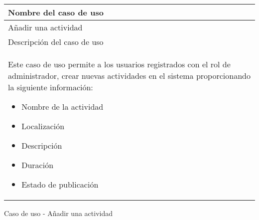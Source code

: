 \begin{identificacionCasoDeUso}
	\begin{tabular} { | p{16.5cm} | }
		\hline
		Nombre del caso de uso      \\ \hline
		Añadir una actividad        \\ \hline
		Descripción del caso de uso \\ \hline
		Este caso de uso permite a los usuarios registrados con el rol de administrador, crear nuevas actividades en el sistema proporcionando la siguiente información:
		\begin{itemize}
			\item Nombre de la actividad
			\item Localización
			\item Descripción
			\item Duración
			\item Estado de publicación
		\end{itemize} \\ \hline
	\end{tabular}
	\caption{Caso de uso - Añadir una actividad}
\end{identificacionCasoDeUso}